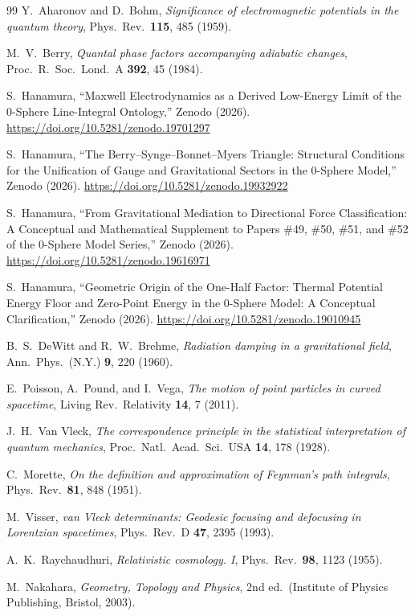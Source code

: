 \documentclass[%
 reprint, amsmath,amssymb, aps, prb, ]{revtex4-2}
\numberwithin{equation}{section}
\begin{document}
\begin{thebibliography}{99}
 Y.~Aharonov and D.~Bohm, \textit{Significance of electromagnetic potentials in the quantum theory}, Phys.\ Rev.\ \textbf{115}, 485 (1959).

 M.~V.~Berry, \textit{Quantal phase factors accompanying adiabatic changes}, Proc.\ R.\ Soc.\ Lond.\ A \textbf{392}, 45 (1984).

S.~Hanamura,
``Maxwell Electrodynamics as a Derived Low-Energy Limit of the 0-Sphere Line-Integral Ontology,''
Zenodo (2026).
\href{https://doi.org/10.5281/zenodo.19701297}{https://doi.org/10.5281/zenodo.19701297}

S.~Hanamura,
``The Berry--Synge--Bonnet--Myers Triangle: Structural Conditions for the Unification of Gauge and Gravitational Sectors in the 0-Sphere Model,''
Zenodo (2026).
\href{https://doi.org/10.5281/zenodo.19932922}{https://doi.org/10.5281/zenodo.19932922}

S.~Hanamura,
``From Gravitational Mediation to Directional Force Classification: A Conceptual and Mathematical Supplement to Papers \#49, \#50, \#51, and \#52 of the 0-Sphere Model Series,''
Zenodo (2026).
\href{https://doi.org/10.5281/zenodo.19616971}{https://doi.org/10.5281/zenodo.19616971}

S.~Hanamura,
``Geometric Origin of the One-Half Factor: Thermal Potential Energy Floor and Zero-Point Energy in the 0-Sphere Model: A Conceptual Clarification,''
Zenodo (2026).
\href{https://doi.org/10.5281/zenodo.19010945}{https://doi.org/10.5281/zenodo.19010945}

 B.~S.~DeWitt and R.~W.~Brehme, \textit{Radiation damping in a gravitational field}, Ann.\ Phys.\ (N.Y.) \textbf{9}, 220 (1960).

 E.~Poisson, A.~Pound, and I.~Vega, \textit{The motion of point particles in curved spacetime}, Living Rev.\ Relativity \textbf{14}, 7 (2011).

 J.~H.~Van Vleck, \textit{The correspondence principle in the statistical interpretation of quantum mechanics}, Proc.\ Natl.\ Acad.\ Sci.\ USA \textbf{14}, 178 (1928).

 C.~Morette, \textit{On the definition and approximation of Feynman's path integrals}, Phys.\ Rev.\ \textbf{81}, 848 (1951).

 M.~Visser, \textit{van Vleck determinants: Geodesic focusing and defocusing in Lorentzian spacetimes}, Phys.\ Rev.\ D \textbf{47}, 2395 (1993).

 A.~K.~Raychaudhuri, \textit{Relativistic cosmology. I}, Phys.\ Rev.\ \textbf{98}, 1123 (1955).

 M.~Nakahara, \textit{Geometry, Topology and Physics}, 2nd ed.\ (Institute of Physics Publishing, Bristol, 2003).

\end{thebibliography}
\end{document}
